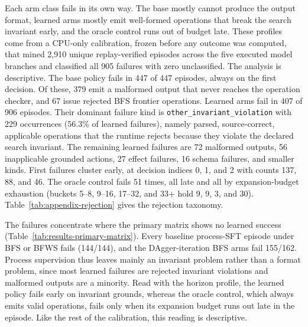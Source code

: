 Each arm class fails in its own way. The base mostly cannot produce the output format, learned arms mostly emit well-formed operations that break the search invariant early, and the oracle control runs out of budget late. These profiles come from a CPU-only calibration, frozen before any outcome was computed, that mined 2,910 unique replay-verified episodes across the five executed model branches and classified all 905 failures with zero unclassified. The analysis is descriptive. The base policy fails in 447 of 447 episodes, always on the first decision. Of these, 379 emit a malformed output that never reaches the operation checker, and 67 issue rejected BFS frontier operations. Learned arms fail in 407 of 906 episodes. Their dominant failure kind is \texttt{other\_invariant\_violation} with 229 occurrences (56.3\% of learned failures), namely parsed, source-correct, applicable operations that the runtime rejects because they violate the declared search invariant. The remaining learned failures are 72 malformed outputs, 56 inapplicable grounded actions, 27 effect failures, 16 schema failures, and smaller kinds. First failures cluster early, at decision indices 0, 1, and 2 with counts 137, 88, and 46. The oracle control fails 51 times, all late and all by expansion-budget exhaustion (buckets 5--8, 9--16, 17--32, and 33+ hold 9, 9, 3, and 30). Table~\ref{tab:appendix-rejection} gives the rejection taxonomy.

The failures concentrate where the primary matrix shows no learned success (Table~\ref{tab:results-primary-matrix}). Every baseline process-SFT episode under BFS or BFWS fails (144/144), and the DAgger-iteration BFS arms fail 155/162. Process supervision thus leaves mainly an invariant problem rather than a format problem, since most learned failures are rejected invariant violations and malformed outputs are a minority. Read with the horizon profile, the learned policy fails early on invariant grounds, whereas the oracle control, which always emits valid operations, fails only when its expansion budget runs out late in the episode. Like the rest of the calibration, this reading is descriptive.

